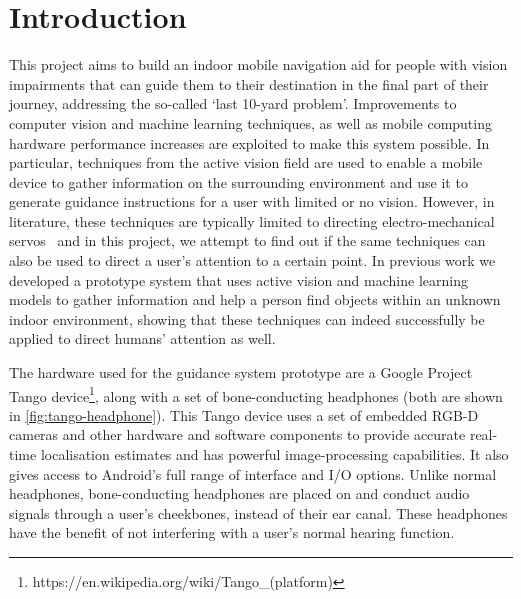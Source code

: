 \documentclass[acmsmall]{acmart}
\begin{document}


\maketitle

\section{Introduction}

This project aims to build an indoor mobile navigation aid for people with vision impairments that can guide them to their destination in the final part of their journey, addressing the so-called `last 10-yard problem'.
Improvements to computer vision and machine learning techniques, as well as mobile computing hardware performance increases are exploited to make this system possible.
In particular, techniques from the active vision field are used to enable a mobile device to gather information on the surrounding environment and use it to generate guidance instructions for a user with limited or no vision.
However, in literature, these techniques are typically limited to directing electro-mechanical servos~\citep{bajcsy2018revisiting} and in this project, we attempt to find out if the same techniques can also be used to direct a user's attention to a certain point. 
In previous work we developed a prototype system that uses active vision and machine learning models to gather information and help a person find objects within an unknown indoor environment, showing that these techniques can indeed successfully be applied to direct humans' attention as well\citep{lock2019active}.

The hardware used for the guidance system prototype are a Google Project Tango device\footnote{https://en.wikipedia.org/wiki/Tango\_(platform)}, along with a set of bone-conducting headphones (both are shown in \cref{fig:tango-headphone}).
This Tango device uses a set of embedded RGB-D cameras and other hardware and software components to provide accurate real-time localisation estimates and has powerful image-processing capabilities.
It also gives access to Android's full range of interface and I/O options.
Unlike normal headphones, bone-conducting headphones are placed on and conduct audio signals through a user's cheekbones, instead of their ear canal.
These headphones have the benefit of not interfering with a user's normal hearing function.
\end{document}
